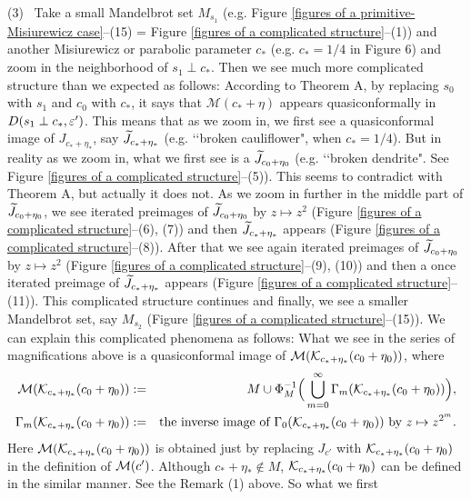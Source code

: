 \begin{rem*}
\noin
(3) \ 
Take a small Mandelbrot set $M_{s_1}$ (e.g. 
Figure \ref{figures of a primitive-Misiurewicz case}--(15) 
= Figure \ref{figures of a complicated structure}--(1)) 
and another Misiurewicz or parabolic parameter $c_*$ (e.g. $c_* = 1/4$ in
Figure 6) and zoom in the neighborhood of $s_1 \perp c_*$. Then we
see much more complicated structure than we expected as follows:
According to Theorem A, by replacing $s_0$ with $s_1$ and $c_0$ with $c_*$, 
it says that ${\mathcal M}(c_* + \eta)$
appears quasiconformally in $D(s_1 \perp c_*, \varepsilon')$. This means that as 
we zoom in, we first see a quasiconformal image of $J_{c_*+\eta_*}$, say 
$\widetilde{J}_{c_*+\eta_*}$ (e.g. \lq\lq broken cauliflower", when $c_* = 1/4$). 
But in reality as we zoom in, what we first see is a $\widetilde{J}_{c_0+\eta_0}$ 
(e.g. \lq\lq broken dendrite". 
See Figure \ref{figures of a complicated structure}--(5)).
This seems to contradict with Theorem A, but actually it does not. As 
we zoom in further in the middle part of $\widetilde{J}_{c_0+\eta_0}$,  we
see iterated preimages of $\widetilde{J}_{c_0+\eta_0}$ by $z \mapsto z^2$ 
(Figure \ref{figures of a complicated structure}--(6), (7)) 
and then 
$\widetilde{J}_{c_*+\eta_*}$ appears 
(Figure \ref{figures of a complicated structure}--(8)). After that we 
see again iterated preimages of $\widetilde{J}_{c_0+\eta_0}$ by $z \mapsto z^2$ 
(Figure \ref{figures of a complicated structure}--(9), (10)) 
and then a once iterated preimage of $\widetilde{J}_{c_*+\eta_*}$ appears
(Figure \ref{figures of a complicated structure}--(11)). This complicated 
structure continues and finally, we see a smaller Mandelbrot set,
say $M_{s_2}$ (Figure \ref{figures of a complicated structure}--(15)). 
We can explain this complicated phenomena as follows: What we see
in the series of magnifications above is a quasiconformal image of 
${\mathcal{M}} ({\mathcal{K}}_{c_*+\eta_*}(c_0+\eta_0))$, where
\begin{eqnarray*}
\cM (\cK_{c_*+\eta_*}(c_0+\eta_0))
& := &
M \cup 
\Phi_M^{-1}\Big( 
       \bigcup_{m=0}^\infty \Gamma_m(\cK_{c_*+\eta_*}(c_0+\eta_0)) \Big), \\
\Gamma_m(\cK_{c_*+\eta_*}(c_0+\eta_0)) 
& := &
\text{the inverse image of } \Gamma_0(\cK_{c_*+\eta_*}(c_0+\eta_0)) \ \text{by} \
z \mapsto z^{2^m}. 
\end{eqnarray*}
Here ${\mathcal{M}} ({\mathcal{K}}_{c_*+\eta_*}(c_0+\eta_0))$ is obtained just by replacing
$J_{c'}$ with ${\mathcal{K}}_{c_*+\eta_*}(c_0+\eta_0)$ in the definition of 
${\mathcal{M}}(c')$. Although $c_*+\eta_* \notin M$, 
${\mathcal{K}}_{c_*+\eta_*}(c_0+\eta_0)$ can be defined in the similar manner. 
See the Remark (1) above. So what we first 

\end{rem*}
